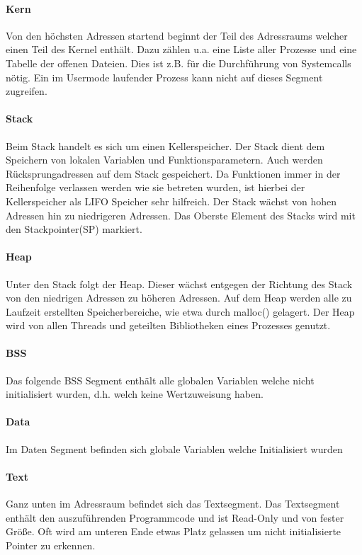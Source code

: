 \documentclass[12pt,a4paper]{article}
\begin{document}
\paragraph{Kern}
Von den höchsten Adressen startend beginnt der Teil des Adressraums welcher einen Teil des Kernel enthält. Dazu zählen u.a. eine Liste aller Prozesse und eine Tabelle der offenen Dateien. Dies ist z.B. für die Durchführung von Systemcalls nötig. Ein im Usermode laufender Prozess kann nicht auf dieses Segment zugreifen. 

\paragraph{Stack}
Beim Stack handelt es sich um einen Kellerspeicher. Der Stack dient dem Speichern von lokalen Variablen und Funktionsparametern. Auch werden Rücksprungadressen auf dem Stack gespeichert. Da Funktionen immer in der Reihenfolge verlassen werden wie sie betreten wurden, ist hierbei der Kellerspeicher als LIFO Speicher sehr hilfreich. Der Stack wächst von hohen Adressen hin zu niedrigeren Adressen. Das Oberste Element des Stacks wird mit den Stackpointer(SP) markiert.

\paragraph{Heap}
Unter den Stack folgt der Heap. Dieser wächst entgegen der Richtung des Stack von den niedrigen Adressen zu höheren Adressen. Auf dem Heap werden alle zu Laufzeit erstellten Speicherbereiche, wie etwa durch malloc() gelagert. Der Heap wird von allen Threads und geteilten Bibliotheken eines Prozesses genutzt.

\paragraph{BSS}
Das folgende BSS Segment enthält alle globalen Variablen welche nicht initialisiert wurden, d.h. welch keine Wertzuweisung haben.

\paragraph{Data}
Im Daten Segment befinden sich globale Variablen welche Initialisiert wurden

\paragraph{Text}
Ganz unten im Adressraum befindet sich das Textsegment. Das Textsegment enthält den auszuführenden Programmcode und ist Read-Only und von fester Größe. Oft wird am unteren Ende etwas Platz gelassen um nicht initialisierte Pointer zu erkennen.
\end{document}
